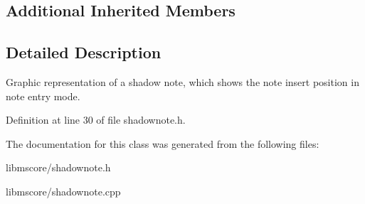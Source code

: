 \subsection*{Additional Inherited Members}


\subsection{Detailed Description}
Graphic representation of a shadow note, which shows the note insert position in note entry mode. 

Definition at line 30 of file shadownote.\+h.



The documentation for this class was generated from the following files\+:\begin{DoxyCompactItemize}
\item 
libmscore/shadownote.\+h\item 
libmscore/shadownote.\+cpp\end{DoxyCompactItemize}
